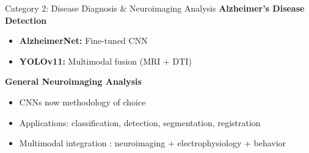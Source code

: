 \documentclass[aspectratio=169]{beamer}
\begin{document}
\begin{frame}{Category 2: Disease Diagnosis \& Neuroimaging Analysis}
  \textbf{Alzheimer's Disease Detection}
  \begin{itemize}
    \item \textbf{AlzheimerNet:} Fine-tuned CNN \cite{shamratAlzheimerNetEffectiveDeep2023}
    \item \textbf{YOLOv11:} Multimodal fusion (MRI + DTI) \cite{hechkelEarlyDetectionClassification2025}
  \end{itemize}
  
  \vspace{0.5em}
  
  \textbf{General Neuroimaging Analysis}
  \begin{itemize}
    \item CNNs now methodology of choice \cite{litjensSurveyDeepLearning2017}
    \item Applications: classification, detection, segmentation, registration
    \item Multimodal integration \cite{lorenziIntegrationMultimodalData2023}: neuroimaging + electrophysiology + behavior
  \end{itemize}
\end{frame}
\end{document}
